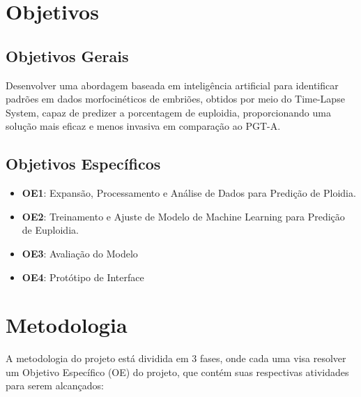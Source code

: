 \section{Objetivos}

\subsection{Objetivos Gerais}
Desenvolver uma abordagem baseada em inteligência artificial para identificar padrões em dados morfocinéticos de embriões, obtidos por meio do Time-Lapse System, capaz de predizer a porcentagem de euploidia, proporcionando uma solução mais eficaz e menos invasiva em comparação ao PGT-A.

\subsection{Objetivos Específicos}
\begin{itemize}
    \item \textbf{OE1}: Expansão, Processamento e Análise de Dados para Predição de Ploidia.
    \item \textbf{OE2}: Treinamento e Ajuste de Modelo de Machine Learning para Predição de Euploidia.
    \item \textbf{OE3}: Avaliação do Modelo
    \item \textbf{OE4}: Protótipo de Interface
\end{itemize}

\section{Metodologia}
A metodologia do projeto está dividida em 3 fases, onde cada uma visa resolver um Objetivo Específico (OE) do projeto, que contém suas respectivas atividades para serem alcançados:

